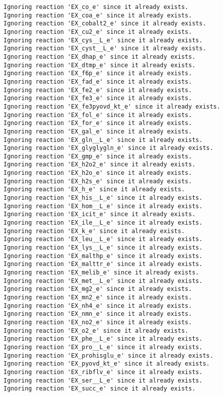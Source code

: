 \documentclass[
  letterpaper,
  DIV=11,
  numbers=noendperiod]{scrartcl}
\begin{document}
\begin{verbatim}
Ignoring reaction 'EX_co_e' since it already exists.
Ignoring reaction 'EX_coa_e' since it already exists.
Ignoring reaction 'EX_cobalt2_e' since it already exists.
Ignoring reaction 'EX_cu2_e' since it already exists.
Ignoring reaction 'EX_cys__L_e' since it already exists.
Ignoring reaction 'EX_cyst__L_e' since it already exists.
Ignoring reaction 'EX_dhap_e' since it already exists.
Ignoring reaction 'EX_dtmp_e' since it already exists.
Ignoring reaction 'EX_f6p_e' since it already exists.
Ignoring reaction 'EX_fad_e' since it already exists.
Ignoring reaction 'EX_fe2_e' since it already exists.
Ignoring reaction 'EX_fe3_e' since it already exists.
Ignoring reaction 'EX_fe3pyovd_kt_e' since it already exists.
Ignoring reaction 'EX_fol_e' since it already exists.
Ignoring reaction 'EX_for_e' since it already exists.
Ignoring reaction 'EX_gal_e' since it already exists.
Ignoring reaction 'EX_gln__L_e' since it already exists.
Ignoring reaction 'EX_glyglygln_e' since it already exists.
Ignoring reaction 'EX_gmp_e' since it already exists.
Ignoring reaction 'EX_h2o2_e' since it already exists.
Ignoring reaction 'EX_h2o_e' since it already exists.
Ignoring reaction 'EX_h2s_e' since it already exists.
Ignoring reaction 'EX_h_e' since it already exists.
Ignoring reaction 'EX_his__L_e' since it already exists.
Ignoring reaction 'EX_hom__L_e' since it already exists.
Ignoring reaction 'EX_icit_e' since it already exists.
Ignoring reaction 'EX_ile__L_e' since it already exists.
Ignoring reaction 'EX_k_e' since it already exists.
Ignoring reaction 'EX_leu__L_e' since it already exists.
Ignoring reaction 'EX_lys__L_e' since it already exists.
Ignoring reaction 'EX_malthp_e' since it already exists.
Ignoring reaction 'EX_malttr_e' since it already exists.
Ignoring reaction 'EX_melib_e' since it already exists.
Ignoring reaction 'EX_met__L_e' since it already exists.
Ignoring reaction 'EX_mg2_e' since it already exists.
Ignoring reaction 'EX_mn2_e' since it already exists.
Ignoring reaction 'EX_nh4_e' since it already exists.
Ignoring reaction 'EX_nmn_e' since it already exists.
Ignoring reaction 'EX_no2_e' since it already exists.
Ignoring reaction 'EX_o2_e' since it already exists.
Ignoring reaction 'EX_phe__L_e' since it already exists.
Ignoring reaction 'EX_pro__L_e' since it already exists.
Ignoring reaction 'EX_prohisglu_e' since it already exists.
Ignoring reaction 'EX_pyovd_kt_e' since it already exists.
Ignoring reaction 'EX_ribflv_e' since it already exists.
Ignoring reaction 'EX_ser__L_e' since it already exists.
Ignoring reaction 'EX_succ_e' since it already exists.

\end{verbatim}
\end{document}
